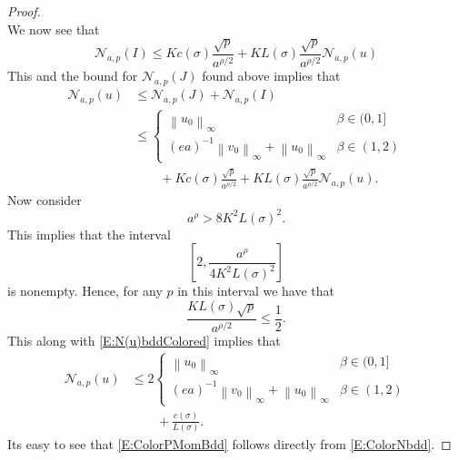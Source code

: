 \documentclass[a4paper,11pt]{article}
\numberwithin{equation}{section}
\theoremstyle{plain}
\theoremstyle{definition}
\newcommand{\Norm}[1]{\left\|  #1   \right\|}
\numberwithin{NQ}{section}
\numberwithin{LQ}{section}
\numberwithin{ZQ}{section}
\begin{document}
\begin{proof}
\[		\] 
		We now see that 
		\begin{equation}
		\mathcal{N}_{a,p}(I)\le K c(\sigma)\frac{\sqrt{p}}{ a^{\rho /2}} + K L(\sigma) \frac{\sqrt{p}}{ a^{\rho/2}} \mathcal{N}_{a,p}(u)
		\end{equation}
		This and the bound for $\mathcal{N}_{a,p}(J)$ found above implies that 
		\begin{align}
		\mathcal{N}_{a,p}(u) &\le \mathcal{N}_{a,p}(J) + \mathcal{N}_{a,p}(I) \nonumber \\
		& \le \begin{cases}
		\Norm{u_0}_{\infty} & \beta \in (0,1] \nonumber \\
		(ea)^{-1}\Norm{v_0}_{\infty} + \Norm{u_0}_{\infty} & \beta \in (1,2)
		\end{cases} \\
		& \qquad + K c(\sigma)\frac{\sqrt{p}}{ a^{\rho /2}} + K L(\sigma) \frac{\sqrt{p}}{ a^{\rho/2}} \mathcal{N}_{a,p}(u) \label{E:N(u)bddColored}.
		\end{align}
		Now consider 
		\[
		a^\rho > 8K^2L(\sigma)^2.
		\]
		This implies that the interval 
		\[
		\left[2, \frac{a^\rho}{4K^2L(\sigma)^2}  \right]
		\]
		is nonempty. Hence, for any $p$ in this interval we have that 
		\[
		\frac{KL(\sigma)\sqrt{p}}{a^{\rho/2}} \le \frac{1}{2}.
		\]
		This along with \eqref{E:N(u)bddColored} implies that 
		\begin{align*}
		\mathcal{N}_{a,p}(u) &\le 2\begin{cases}
		\Norm{u_0}_{\infty} & \beta \in (0,1] \nonumber \\
		(ea)^{-1}\Norm{v_0}_{\infty} + \Norm{u_0}_{\infty} & \beta \in (1,2)
		\end{cases} \\
		& \qquad + \frac{c(\sigma)}{L(\sigma)}.
		\end{align*}
		Its easy to see that \eqref{E:ColorPMomBdd} follows directly from \eqref{E:ColorNbdd}. 
	\end{proof}
\end{document}
